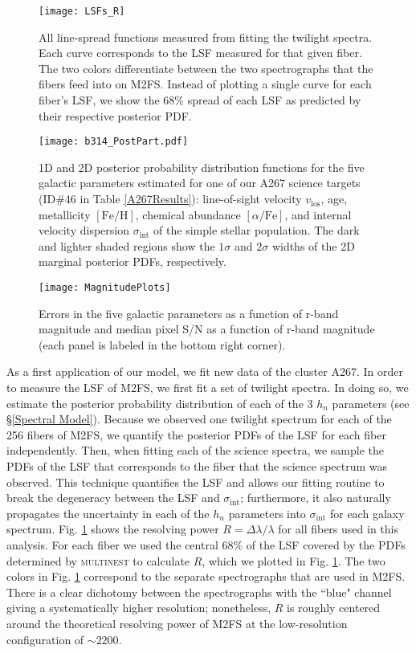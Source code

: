 \documentclass[twocolumn]{aastex6}
\def\feh{\mathrm{[Fe/H]}}
\def\afe{[\alpha/\mathrm{Fe}]}
\def\vlos{v_\mathrm{los}}
\def\disp{\sigma_\mathrm{int}}
\begin{document}
\begin{figure}
\centering
\texttt{[image: LSFs\_R]}
\label{AllLSFs}
\caption{All line-spread functions measured from fitting the twilight spectra.  Each curve corresponds to the LSF measured for that given fiber.  The two colors differentiate between the two spectrographs that the fibers feed into on M2FS.  Instead of plotting a single curve for each fiber's LSF, we show the 68\% spread of each LSF as predicted by their respective posterior PDF.}
\end{figure}




\begin{figure}
\centering
\texttt{[image: b314\_PostPart.pdf]}
\caption{1D and 2D posterior probability distribution functions for the five galactic parameters estimated for one of our A267 science targets (ID\#46 in Table \ref{A267Results}): line-of-sight velocity $\vlos$, age, metallicity $\feh$, chemical abundance $\afe$, and internal velocity dispersion $\disp$ of the simple stellar population.  The dark and lighter shaded regions show the $1\sigma$ and $2\sigma$ widths of the 2D marginal posterior PDFs, respectively.}
\label{A267PosteriorPart}
\end{figure}

\begin{figure}
\centering
\texttt{[image: MagnitudePlots]}
\caption{Errors in the five galactic parameters as a function of r-band magnitude and median pixel S/N as a function of r-band magnitude (each panel is labeled in the bottom right corner).}
\label{A267MagPlots}
\end{figure}

As a first application of our model, we fit new data of the cluster A267.
In order to measure the LSF of M2FS, we first fit a set of twilight spectra.
In doing so, we estimate the posterior probability distribution of each of the 3 $h_n$ parameters (see \S\ref{Spectral Model}).
Because we observed one twilight spectrum for each of the 256 fibers of M2FS, we quantify the posterior PDFs of the LSF for each fiber independently.
Then, when fitting each of the science spectra, we sample the PDFs of the LSF that corresponds to the fiber that the science spectrum was observed.
This technique quantifies the LSF and allows our fitting routine to break the degeneracy between the LSF and $\disp$; furthermore, it also naturally propagates the uncertainty in each of the $h_n$ parameters into $\disp$ for each galaxy spectrum.
Fig. \ref{AllLSFs} shows the resolving power $R=\Delta\lambda/\lambda$ for all fibers used in this analysis.
For each fiber we used the central 68\% of the LSF covered by the PDFs determined by \textsc{multinest} to calculate $R$, which we plotted in Fig. \ref{AllLSFs}.
The two colors in Fig. \ref{AllLSFs} correspond to the separate spectrographs that are used in M2FS.
There is a clear dichotomy between the spectrographs with the ``blue" channel giving a systematically higher resolution; nonetheless, $R$ is roughly centered around the theoretical resolving power of M2FS at the low-resolution configuration of $\sim2200$.
\end{document}
